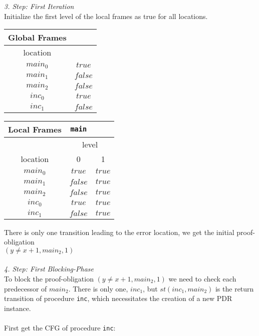 \documentclass{article}
\begin{document}
	\vspace*{1em}
	\textsl{3. Step: First Iteration} \\
	Initialize the first level of the local frames as true for all locations. \\
	\begin{minipage}{.5\textwidth}
	\setlength\tabcolsep{0.35em}
	\begin{center}
		\begin{tabu}{cc}
			Global Frames \\
			\toprule
			location & \\
			$main_0$ & $true$ \\
			$main_1$ & $false$ \\
			$main_2$ & $false$ \\
			$inc_0$ & $true$ \\
			$inc_1$ & $false$\\
			\bottomrule
		\end{tabu}
	\end{center}
	\end{minipage}
	\hfill
	\begin{minipage}{.4\textwidth}
		\setlength\tabcolsep{0.35em}
		\begin{center}
			\begin{tabu}{ccc}
				Local Frames & \texttt{main}\\
				\toprule
				& \multicolumn{2}{c}{level} \\
				\cmidrule(lr){2-3}
				location & 0 & 1 \\
				\cmidrule{1-3}
				$main_0$ & $true$ & $true$ \\
				$main_1$ & $false$ & $true$\\
				$main_2$ & $false$ & $true$\\
				$inc_0$ & $true$ & $true$\\
				$inc_1$ & $false$ & $true$\\
				\bottomrule
			\end{tabu}
		\end{center}	
	\end{minipage}
	
	\vspace*{1em}

	There is only one transition leading to the error location, we get the initial proof-obligation \\ $(y \neq x + 1, main_2, 1)$  \\ \\
	
	\textsl{4. Step: First Blocking-Phase} \\
	To block the proof-obligation $(y \neq x + 1, main_2, 1)$ we need to check each predecessor of $main_2$. There is only one, $inc_1$, but $st(inc_1, main_2)$ is the return transition of procedure \texttt{inc}, which necessitates the creation of a new PDR instance. \\ \\
	First get the CFG of procedure \texttt{inc}: \\ \\
	
\end{document}
